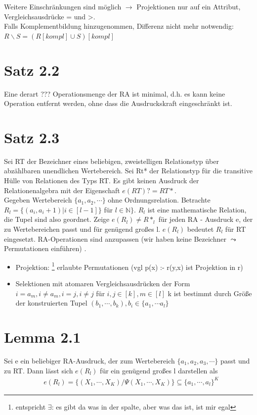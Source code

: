 \documentclass[12pt, a4paper]{article}
\begin{document}
Weitere Einschränkungen sind möglich $\rightarrow$ Projektionen nur auf ein Attribut, Vergleichsausdrücke = und >. \\
Falls Komplementbildung hinzugenommen, Differenz nicht mehr notwendig: \\
$R \backslash S = (R[kompl] \cup S)[kompl]$

\section*{Satz 2.2}
Eine derart ??? Operationsmenge der RA ist minimal, d.h. es kann keine Operation entfernt werden, ohne dass die Ausdruckskraft eingeschränkt ist.

\section*{Satz 2.3}
Sei RT der Bezeichner eines beliebigen, zweistelligen Relationstyp über abzählbaren unendlichen Wertebereich. Sei Rt* der Relationstyp für die transitive Hülle von Relationen des Typs RT. Es gibt keinen Ausdruck  der Relationenalgebra mit der Eigenschaft $e(RT) ? = RT*$. \\

Gegeben Wertebereich $\{a_1, a_2, \cdots \}$ ohne Ordnungsrelation. Betrachte $R_l = \{ (a_i, a_i+1) | i \in [l-1] \}$ für $l \in \mathbb{N} \}$. $R_l$ ist eine mathematische Relation, die Tupel sind also geordnet. Zeige $e(R_l) \neq R*_l$ für jeden RA - Ausdruck e, der zu Wertebereichen passt und für genügend großes l. $e(R_l)$ bedeutet $R_l$ für RT eingesetzt. RA-Operationen sind anzupassen (wir haben keine Bezeichner $\leadsto$ Permutationen einführen) .
\begin{itemize}
	\item Projektion: \footnote{entspricht $\exists$: es gibt da was in der spalte, aber was das ist, ist mir egal} erlaubte Permutationen (vgl p(x) :- r(y,x) ist Projektion in r)
	\item Selektionen mit atomaren Vergleichsausdrücken der Form $i = a_m, i \neq a_m, i = j, i \neq j$ für $i,j \in [k], m \in [l]$ k ist bestimmt durch Größe der konstruierten Tupel $(b_1, \cdots, b_k), b_i \in \{a_1, \cdots a_l \}$
\end{itemize}

\section*{Lemma 2.1} 
Sei e ein beliebiger RA-Ausdruck, der zum Wertebereich $\{ a_1, a_2, a_3, \cdots \}$ passt und zu RT. Dann lässt sich $e(R_l)$ für ein genügend großes l darstellen als
\begin{align*}
&e(R_l) = \{ (X_1, \cdots, X_K) / \Psi(X_1, \cdots, X_K) \} \subseteq \{ a_1, \cdots, a_l \}^K
\end{align*}
\end{document}
